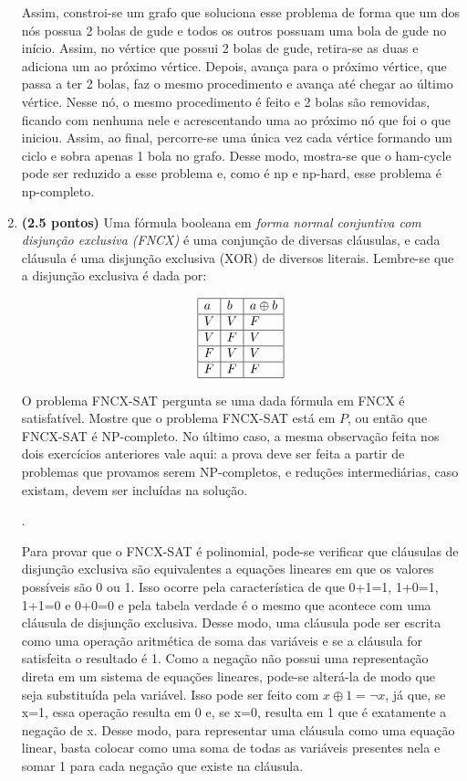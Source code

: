 \documentclass[12pt]{article}
\newcommand{\resposta}[1]{ \noindent {\bf Solução}.{\color{blue} #1}}
\begin{document}
\begin{enumerate}
{	Assim, constroi-se um grafo que soluciona esse problema de forma que um dos nós possua 2 bolas de gude e todos os outros possuam uma bola de gude no início. Assim, no vértice que possui 2 bolas de gude, retira-se as duas e adiciona um ao próximo vértice. Depois, avança para o próximo vértice, que passa a ter 2 bolas, faz o mesmo procedimento e avança até chegar ao último vértice. Nesse nó, o mesmo procedimento é feito e 2 bolas são removidas, ficando com nenhuma nele e acrescentando uma ao próximo nó que foi o que iniciou. Assim, ao final, percorre-se uma única vez cada vértice formando um ciclo e sobra apenas 1 bola no grafo. Desse modo, mostra-se que o ham-cycle pode ser reduzido a esse problema e, como é np e np-hard, esse problema é np-completo.
	
  }
  
\item {\bf (2.5 pontos)} Uma fórmula booleana em {\it forma normal conjuntiva com disjunção exclusiva (FNCX)} é uma conjunção de diversas cláusulas, e cada cláusula é uma disjunção exclusiva (XOR) de diversos literais. Lembre-se que a disjunção exclusiva é dada por:

  $$\begin{array}{|l|l|l|}\hline
      a & b & a \oplus b \\ \hline
      V & V & F \\ \hline
      V & F & V \\ \hline
      F & V & V \\ \hline
      F & F & F \\ \hline
  \end{array}$$

  O problema FNCX-SAT pergunta se uma dada fórmula em FNCX é
  satisfatível. Mostre que o problema FNCX-SAT está em $P$, ou então
  que FNCX-SAT é NP-completo. No último caso, a mesma observação feita
  nos dois exercícios anteriores vale aqui: a prova deve ser feita a
  partir de problemas que provamos serem NP-completos, e reduções
  intermediárias, caso existam, devem ser incluídas na solução.

  \resposta{
    Para provar que o FNCX-SAT é polinomial, pode-se verificar que cláusulas de disjunção exclusiva são equivalentes a equações lineares em que os valores possíveis são 0 ou 1. Isso ocorre pela característica de que 0+1=1, 1+0=1, 1+1=0 e 0+0=0 e pela tabela verdade é o mesmo que acontece com uma cláusula de disjunção exclusiva. Desse modo, uma cláusula pode ser escrita como uma operação aritmética de soma das variáveis e se a cláusula for satisfeita o resultado é 1. Como a negação não possui uma representação direta em um sistema de equações lineares, pode-se alterá-la de modo que seja substituída pela variável. Isso pode ser feito com ${ x \oplus 1 = \neg x}$, já que, se x=1, essa operação resulta em 0 e, se x=0, resulta em 1 que é exatamente a negação de x. Desse modo, para representar uma cláusula como uma equação linear, basta colocar como uma soma de todas as variáveis presentes nela e somar 1 para cada negação que existe na cláusula.

}
\end{enumerate}
\end{document}
